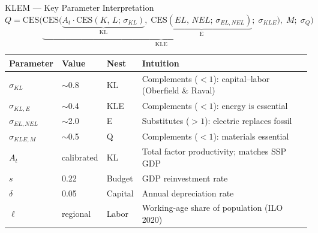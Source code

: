 \documentclass[aspectratio=169, 10pt]{beamer}
\begin{document}
\begin{frame}{KLEM --- Key Parameter Interpretation}
\vspace{0.2em}
\centering
\small
$Q = \mathrm{CES}\!\Big(\underbrace{\mathrm{CES}\!\big(\underbrace{A_t \cdot \mathrm{CES}(K,\,L;\,\sigma_{KL})}_{\text{KL}},\;\underbrace{\mathrm{CES}(EL,\,NEL;\,\sigma_{EL,NEL})}_{\text{E}};\;\sigma_{KLE}\big)}_{\text{KLE}},\;M;\;\sigma_{Q}\Big)$

\vspace{0.5em}
\begin{tabular}{@{} l l l l @{}}
\toprule
\textbf{Parameter} & \textbf{Value} & \textbf{Nest} & \textbf{Intuition} \\
\midrule
\rowcolor{SpruceGreen!8}
$\sigma_{KL}$ & $\sim$0.8 & KL & Complements ($<\!1$): capital--labor (Oberfield \& Raval) \\
$\sigma_{KL,E}$ & $\sim$0.4 & KLE & Complements ($<\!1$): energy is essential \\
\rowcolor{SpruceGreen!8}
$\sigma_{EL,NEL}$ & $\sim$2.0 & E & Substitutes ($>\!1$): electric replaces fossil \\
$\sigma_{KLE,M}$ & $\sim$0.5 & Q & Complements ($<\!1$): materials essential \\
\midrule
\rowcolor{SpruceGreen!8}
$A_t$ & calibrated & KL & Total factor productivity; matches SSP GDP \\
$s$ & 0.22 & Budget & GDP reinvestment rate \\
\rowcolor{SpruceGreen!8}
$\delta$ & 0.05 & Capital & Annual depreciation rate \\
$\ell$ & regional & Labor & Working-age share of population (ILO 2020) \\
\bottomrule
\end{tabular}
\end{frame}
\end{document}
